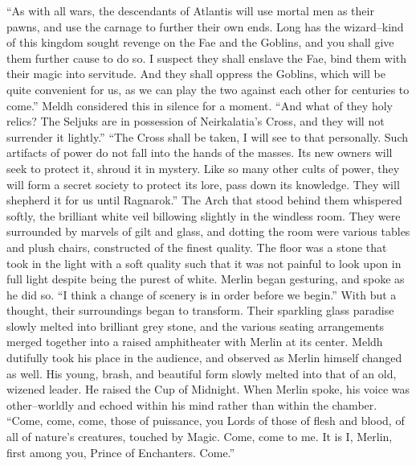 “As with all wars, the descendants of Atlantis will use mortal men as their pawns, and use the carnage to further their own ends. Long has the wizard\mbox{--}kind of this kingdom sought revenge on the Fae and the Goblins, and you shall give them further cause to do so. I suspect they shall enslave the Fae, bind them with their magic into servitude. And they shall oppress the Goblins, which will be quite convenient for us, as we can play the two against each other for centuries to come.”
\SmallVSpace
Meldh considered this in silence for a moment. “And what of they holy relics? The Seljuks are in possession of Neirkalatia’s Cross, and they will not surrender it lightly.”
\SmallVSpace
“The Cross shall be taken, I will see to that personally. Such artifacts of power do not fall into the hands of the masses. Its new owners will seek to protect it, shroud it in mystery. Like so many other cults of power, they will form a secret society to protect its lore, pass down its knowledge. They will shepherd it for us until Ragnarok.”
\SmallVSpace
The Arch that stood behind them whispered softly, the brilliant white veil billowing slightly in the windless room. They were surrounded by marvels of gilt and glass, and dotting the room were various tables and plush chairs, constructed of the finest quality. The floor was a stone that took in the light with a soft quality such that it was not painful to look upon in full light despite being the purest of white.
\SmallVSpace
Merlin began gesturing, and spoke as he did so. “I think a change of scenery is in order before we begin.”
\SmallVSpace
With but a thought, their surroundings began to transform. Their sparkling glass paradise slowly melted into brilliant grey stone, and the various seating arrangements merged together into a raised amphitheater with Merlin at its center. Meldh dutifully took his place in the audience, and observed as Merlin himself changed as well. His young, brash, and beautiful form slowly melted into that of an old, wizened leader. He raised the Cup of Midnight.
\SmallVSpace
When Merlin spoke, his voice was other\mbox{--}worldly and echoed within his mind rather than within the chamber. “Come, come, come, those of puissance, you Lords of those of flesh and blood, of all of nature’s creatures, touched by Magic. Come, come to me. It is I, Merlin, first among you, Prince of Enchanters. Come.”

